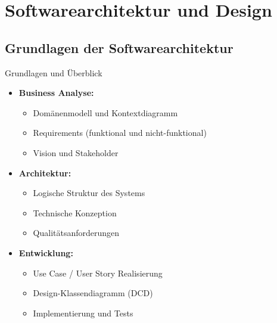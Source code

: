 \section{Softwarearchitektur und Design}


\subsection{Grundlagen der Softwarearchitektur}

\begin{concept}{Grundlagen und Überblick}
\begin{itemize}
    \item \textbf{Business Analyse:}
    \begin{itemize}
        \item Domänenmodell und Kontextdiagramm
        \item Requirements (funktional und nicht-funktional)
        \item Vision und Stakeholder
    \end{itemize}
    
    \item \textbf{Architektur:}
    \begin{itemize}
        \item Logische Struktur des Systems
        \item Technische Konzeption
        \item Qualitätsanforderungen
    \end{itemize}
    
    \item \textbf{Entwicklung:}
    \begin{itemize}
        \item Use Case / User Story Realisierung
        \item Design-Klassendiagramm (DCD)
        \item Implementierung und Tests
    \end{itemize}
\end{itemize}


\end{concept}
